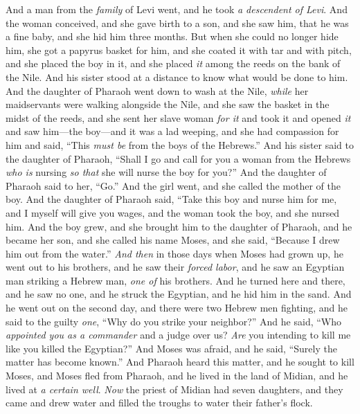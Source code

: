 \begin{biblechapter} %
 And a man from the \textit{family} of Levi went, and he took \textit{a descendent of Levi}.
\verse And the woman conceived, and she gave birth to a son, and she saw him, that he was a fine baby, and she hid him three months.
\verse But when she could no longer hide him, she got a papyrus basket for him, and she coated it with tar and with pitch, and she placed the boy in it, and she placed \textit{it} among the reeds on the bank of the Nile.
\verse And his sister stood at a distance to know what would be done to him.
\verse And the daughter of Pharaoh went down to wash at the Nile, \textit{while} her maidservants were walking alongside the Nile, and she saw the basket in the midst of the reeds, and she sent her slave woman \textit{for it} and took it
\verse and opened \textit{it} and saw him—the boy—and it was a lad weeping, and she had compassion for him and said, “This \textit{must be} from the boys of the Hebrews.”
\verse And his sister said to the daughter of Pharaoh, “Shall I go and call for you a woman from the Hebrews \textit{who is} nursing \textit{so that} she will nurse the boy for you?”
\verse And the daughter of Pharaoh said to her, “Go.” And the girl went, and she called the mother of the boy.
\verse And the daughter of Pharaoh said, “Take this boy and nurse him for me, and I myself will give you wages, and the woman took the boy, and she nursed him.
\verse And the boy grew, and she brought him to the daughter of Pharaoh, and he became her son, and she called his name Moses, and she said, “Because I drew him out from the water.”
\verse \textit{And then} in those days when Moses had grown up, he went out to his brothers, and he saw their \textit{forced labor}, and he saw an Egyptian man striking a Hebrew man, \textit{one of} his brothers.
\verse And he turned here and there, and he saw no one, and he struck the Egyptian, and he hid him in the sand.
\verse And he went out on the second day, and there were two Hebrew men fighting, and he said to the guilty \textit{one}, “Why do you strike your neighbor?”
\verse And he said, “Who \textit{appointed you as a commander} and a judge over us? \textit{Are} you intending to kill me like you killed the Egyptian?” And Moses was afraid, and he said, “Surely the matter has become known.”
\verse And Pharaoh heard this matter, and he sought to kill Moses, and Moses fled from Pharaoh, and he lived in the land of Midian, and he lived at \textit{a certain well}.
\verse \textit{Now} the priest of Midian had seven daughters, and they came and drew water and filled the troughs to water their father’s flock.

\end{biblechapter}
